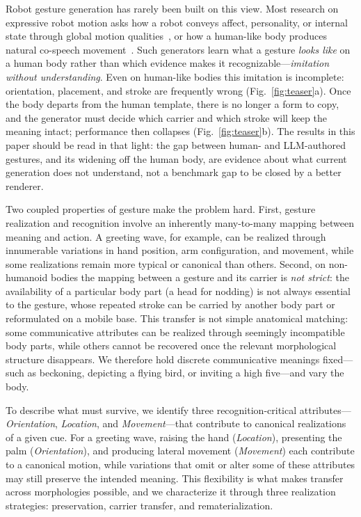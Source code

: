 \documentclass[letterpaper,10pt,conference]{ieeeconf}
\begin{document}
Robot gesture generation has rarely been built on this view. Most research on expressive robot motion asks how a robot conveys affect, personality, or internal state through global motion qualities~\cite{zhou2017timing,knight2014xytheta,knight2016laban}, or how a human-like body produces natural co-speech movement~\cite{kucherenko2020gesticulator,yoon2020trimodal,liu2022beat}. Such generators learn what a gesture \emph{looks like} on a human body rather than which evidence makes it recognizable---\emph{imitation without understanding}. Even on human-like bodies this imitation is incomplete: orientation, placement, and stroke are frequently wrong (Fig.~\ref{fig:teaser}a). Once the body departs from the human template, there is no longer a form to copy, and the generator must decide which carrier and which stroke will keep the meaning intact; performance then collapses (Fig.~\ref{fig:teaser}b). The results in this paper should be read in that light: the gap between human- and LLM-authored gestures, and its widening off the human body, are evidence about what current generation does not understand, not a benchmark gap to be closed by a better renderer.

Two coupled properties of gesture make the problem hard. First, gesture realization and recognition involve an inherently many-to-many mapping between meaning and action. A greeting wave, for example, can be realized through innumerable variations in hand position, arm configuration, and movement, while some realizations remain more typical or canonical than others. Second, on non-humanoid bodies the mapping between a gesture and its carrier is \textit{not strict}: the availability of a particular body part (a head for nodding) is not always essential to the gesture, whose repeated stroke can be carried by another body part or reformulated on a mobile base. This transfer is not simple anatomical matching: some communicative attributes can be realized through seemingly incompatible body parts, while others cannot be recovered once the relevant morphological structure disappears. We therefore hold discrete communicative meanings fixed---such as beckoning, depicting a flying bird, or inviting a high five---and vary the body.

To describe what must survive, we identify three recognition-critical attributes---\textit{Orientation}, \textit{Location}, and \textit{Movement}---that contribute to canonical realizations of a given cue. For a greeting wave, raising the hand (\textit{Location}), presenting the palm (\textit{Orientation}), and producing lateral movement (\textit{Movement}) each contribute to a canonical motion, while variations that omit or alter some of these attributes may still preserve the intended meaning. This flexibility is what makes transfer across morphologies possible, and we characterize it through three realization strategies: preservation, carrier transfer, and rematerialization.
\end{document}

